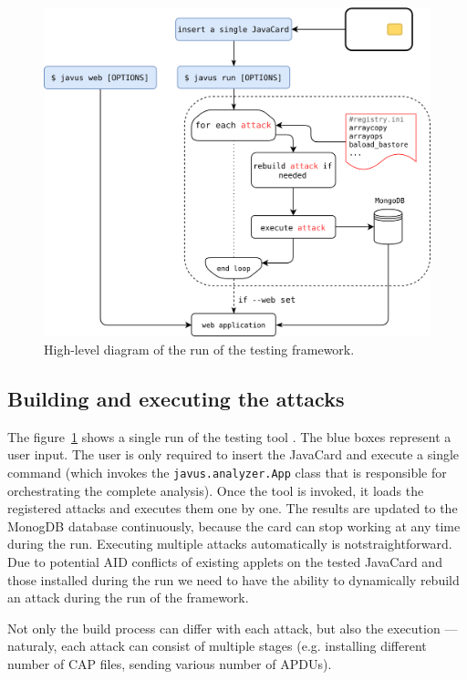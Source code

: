 \documentclass{../llncs/llncs}
\begin{document}
    \begin{figure}[htb]
        \centering
        \includegraphics[width=.9\textwidth]{src/diagrams/full-design-new.png}
        \caption{High-level diagram of the run of the testing framework.}
        \label{fig:full-design-diagram}
    \end{figure}

    \subsection{Building and executing the attacks}\label{sec:build-execute-attacks}

    The figure~\ref{fig:full-design-diagram} shows a single run of the testing tool \javus. The blue boxes represent a user input. The user is only required to insert the JavaCard and execute a single command \javusrun (which invokes the \texttt{javus.analyzer.App} class that is responsible for orchestrating the complete analysis). Once the tool is invoked, it loads the registered attacks and executes them one by one. The results are updated to the MonogDB database continuously, because the card can stop working at any time during the run. Executing multiple attacks automatically is not\linebreak straightforward.  Due to potential AID conflicts of existing applets on the tested JavaCard and those installed during the run we need to have the ability to dynamically rebuild an attack during the run of the framework.

    Not only the build process can differ with each attack, but also the execution --- naturaly, each attack can consist of multiple stages (e.g. installing different number of CAP files, sending various number of APDUs).
\end{document}

